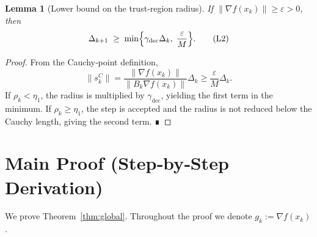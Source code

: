 \documentclass{article}
\newtheorem{lemma}{Lemma}
\begin{document}
\begin{lemma}[Lower bound on the trust‑region radius]\label{lem:radius-lower}
If $\|\nabla f(x_k)\|\ge \varepsilon>0$, then
\[
\Delta_{k+1}\;\ge\;\min\Bigl\{\gamma_{\text{dec}}\Delta_k,\;
\frac{\varepsilon}{M}\Bigr\}.
\tag{L2}
\]
\end{lemma}
\begin{proof}
From the Cauchy‑point definition,
\[
\|s_k^{C}\| = \frac{\|\nabla f(x_k)\|}{\|B_k\nabla f(x_k)\|}\Delta_k
\ge \frac{\varepsilon}{M}\Delta_k .
\]
If $\rho_k<\eta_1$, the radius is multiplied by $\gamma_{\text{dec}}$, yielding the first term in the minimum.  
If $\rho_k\ge\eta_1$, the step is accepted and the radius is not reduced below the Cauchy length, giving the second term. ∎
\end{proof}

\section*{Main Proof (Step‑by‑Step Derivation)}
We prove Theorem~\ref{thm:global}.  Throughout the proof we denote $g_k:=\nabla f(x_k)$.
\end{document}

